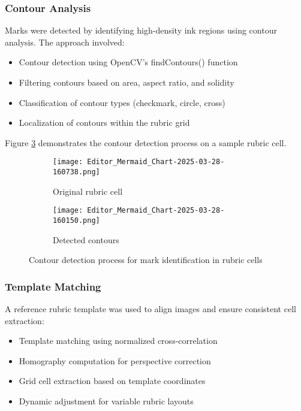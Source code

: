 \documentclass[12pt]{article}
\begin{document}

\subsubsection{Contour Analysis}
Marks were detected by identifying high-density ink regions using contour analysis. The approach involved:
\begin{itemize}
    \item Contour detection using OpenCV's findContours() function
    \item Filtering contours based on area, aspect ratio, and solidity
    \item Classification of contour types (checkmark, circle, cross)
    \item Localization of contours within the rubric grid
\end{itemize}

Figure \ref{fig:contour_analysis} demonstrates the contour detection process on a sample rubric cell.

\begin{figure}[H]
    \centering
    \begin{subfigure}{.45\textwidth}
        \centering
        \texttt{[image: Editor\_Mermaid\_Chart-2025-03-28-160738.png]}
        \caption{Original rubric cell}
        \label{fig:sub1}
    \end{subfigure}
    \hfill
    \begin{subfigure}{.45\textwidth}
        \centering
        \texttt{[image: Editor\_Mermaid\_Chart-2025-03-28-160150.png]}
        \caption{Detected contours}
        \label{fig:sub2}
    \end{subfigure}
    \caption{Contour detection process for mark identification in rubric cells}
    \label{fig:contour_analysis}
\end{figure}

\subsubsection{Template Matching}
A reference rubric template was used to align images and ensure consistent cell extraction:
\begin{itemize}
    \item Template matching using normalized cross-correlation
    \item Homography computation for perspective correction
    \item Grid cell extraction based on template coordinates
    \item Dynamic adjustment for variable rubric layouts
\end{itemize}


\end{document}
\end{itemize}
\end{document}
